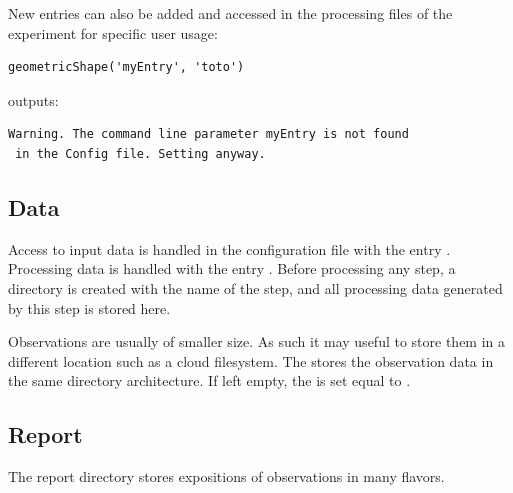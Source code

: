 \documentclass[a4paper,fleqn]{tufte-handout}
\begin{document}
New entries can also be added and accessed in the processing files of the experiment for specific user usage:
\begin{lstlisting}
geometricShape('myEntry', 'toto')
\end{lstlisting}
outputs:
\begin{lstlisting}
Warning. The command line parameter myEntry is not found
 in the Config file. Setting anyway.
\end{lstlisting}


\subsection{Data}

Access to input data is handled in the configuration file with the entry . Processing data is handled with the entry . Before processing any step, a directory is created with the name of the step, and all processing data generated by this step is stored here.

Observations are usually of smaller size. As such it may useful to store them in a different location such as a cloud filesystem. The  stores the observation data in the same directory architecture. If left empty, the  is set equal to .


\subsection{Report}

The report directory stores expositions of observations in many flavors.
\end{document}

